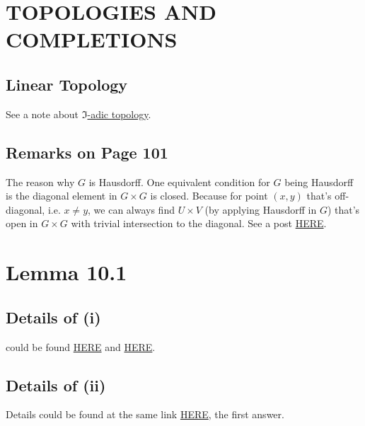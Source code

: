 
\section{TOPOLOGIES AND COMPLETIONS}

\subsection{Linear Topology}

See a note about \href{https://math.gsu.edu/fenescu/commalglectures/8250Lect2.pdf}{$\mathfrak I$-adic topology}. 

\subsection{Remarks on Page 101}

The reason why $G$ is Hausdorff. 
One equivalent condition for $G$ being Hausdorff is the diagonal element in $G\times G$ is closed. 
Because for point $(x,y)$ that's off-diagonal, i.e. $x\neq y$, we can always find $U\times V$ (by applying Hausdorff in $G$) that's open in $G\times G$ with trivial intersection to the diagonal. See a post \href{https://math.stackexchange.com/questions/136922/x-is-hausdorff-if-and-only-if-the-diagonal-of-x-times-x-is-closed}{HERE}.

\section{Lemma 10.1}

\subsection{Details of (i)}
could be found \href{https://math.stackexchange.com/questions/13368/intersection-of-neighborhoods-of-0-subgroup}{HERE} and \href{https://math.stackexchange.com/questions/174955/intersection-of-all-neighborhoods-of-zero-is-a-subgroup}{HERE}.

\subsection{Details of (ii)}
Details could be found at the same link \href{https://math.stackexchange.com/questions/174955/intersection-of-all-neighborhoods-of-zero-is-a-subgroup}{HERE}, the first answer.

